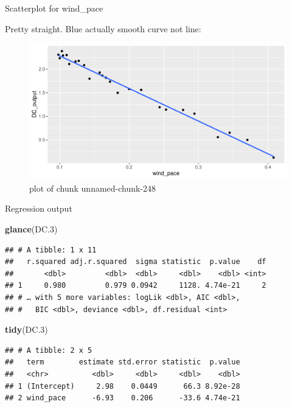 \documentclass[ignorenonframetext,]{beamer}
\newenvironment{Shaded}{\begin{snugshade}}{\end{snugshade}}
\newcommand{\FloatTok}[1]{\textcolor[rgb]{0.00,0.00,0.81}{#1}}
\newcommand{\KeywordTok}[1]{\textcolor[rgb]{0.13,0.29,0.53}{\textbf{#1}}}
\newcommand{\NormalTok}[1]{#1}
\begin{document}
\begin{frame}{Scatterplot for wind\_pace}
\protect\hypertarget{scatterplot-for-wind_pace}{}

Pretty straight. Blue actually smooth curve not line:

\begin{figure}
\centering
\includegraphics{figure/unnamed-chunk-248-1.pdf}
\caption{plot of chunk unnamed-chunk-248}
\end{figure}

\end{frame}

\begin{frame}[fragile]{Regression output}
\protect\hypertarget{regression-output}{}

\begin{Shaded}
\begin{Highlighting}[]
\KeywordTok{glance}\NormalTok{(DC}\FloatTok{.3}\NormalTok{)}
\end{Highlighting}
\end{Shaded}

\begin{verbatim}
## # A tibble: 1 x 11
##   r.squared adj.r.squared  sigma statistic  p.value    df
##       <dbl>         <dbl>  <dbl>     <dbl>    <dbl> <int>
## 1     0.980         0.979 0.0942     1128. 4.74e-21     2
## # … with 5 more variables: logLik <dbl>, AIC <dbl>,
## #   BIC <dbl>, deviance <dbl>, df.residual <int>
\end{verbatim}

\begin{Shaded}
\begin{Highlighting}[]
\KeywordTok{tidy}\NormalTok{(DC}\FloatTok{.3}\NormalTok{)}
\end{Highlighting}
\end{Shaded}

\begin{verbatim}
## # A tibble: 2 x 5
##   term        estimate std.error statistic  p.value
##   <chr>          <dbl>     <dbl>     <dbl>    <dbl>
## 1 (Intercept)     2.98    0.0449      66.3 8.92e-28
## 2 wind_pace      -6.93    0.206      -33.6 4.74e-21
\end{verbatim}

\end{frame}
\end{document}
